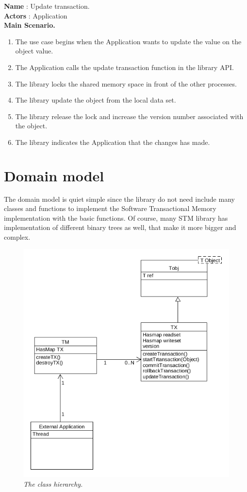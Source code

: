 \documentclass[12pt]{article}
\begin{document}
{\textbf{Name} : Update transaction.\\
\textbf{Actors} : Application\\
\textbf{Main Scenario.}
\begin{enumerate}
  \item The use case begins when the Application wants to update the value on the object value.
  \item The Application calls the update transaction function in the library API.
  \item The library locks the shared memory space in front of the other processes.
  \item The library update the object from the local data set.
  \item The library release the lock and increase the version number associated with the object.
  \item The library indicates the Application that the changes has made.
\end{enumerate}

}

\newpage
\section{Domain model}
The domain model is quiet simple since the library do not need include many classes and functions to implement the Software Transactional Memory implementation with the basic functions. Of course, many STM library has implementation of different binary trees as well, that make it more bigger and complex. 
\begin{figure}[h!]
\centering
\includegraphics[scale=0.5]{Pictures/domainModel.png}
\caption{\textit{\color{gray}The class hierarchy.}}
\end{figure}
\end{document}
